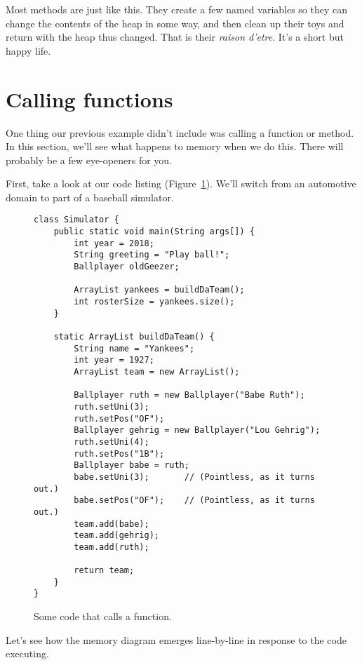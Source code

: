 Most methods are just like this. They create a few named variables so they can
change the contents of the heap in some way, and then clean up their toys
and return with the heap thus changed. That is their \textit{raison d'etre}.
It's a short but happy life.


\section{Calling functions}

One thing our previous example didn't include was calling a function or
method. In this section, we'll see what happens to memory when we do this.
There will probably be a few eye-openers for you.

First, take a look at our code listing (Figure~\ref{fig:functionCode}). We'll
switch from an automotive domain to part of a baseball simulator.

\begin{figure}
\centering
\begin{Verbatim}[fontsize=\footnotesize,samepage=true,frame=single]
class Simulator {
    public static void main(String args[]) {
        int year = 2018;
        String greeting = "Play ball!";
        Ballplayer oldGeezer;

        ArrayList yankees = buildDaTeam();
        int rosterSize = yankees.size();
    }

    static ArrayList buildDaTeam() {
        String name = "Yankees";
        int year = 1927;
        ArrayList team = new ArrayList();

        Ballplayer ruth = new Ballplayer("Babe Ruth");
        ruth.setUni(3);
        ruth.setPos("OF");
        Ballplayer gehrig = new Ballplayer("Lou Gehrig");
        ruth.setUni(4);
        ruth.setPos("1B");
        Ballplayer babe = ruth;
        babe.setUni(3);       // (Pointless, as it turns out.)
        babe.setPos("OF");    // (Pointless, as it turns out.)
        team.add(babe);
        team.add(gehrig);
        team.add(ruth);
        
        return team;
    }
}
\end{Verbatim}
\caption{Some code that calls a function.}
\label{fig:functionCode}
\end{figure}

Let's see how the memory diagram emerges line-by-line in response to the code
executing.

